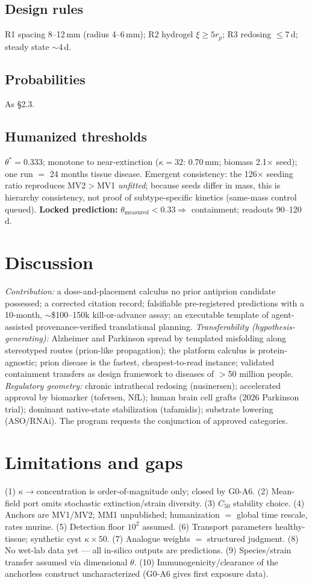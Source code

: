 \documentclass[10pt,twocolumn]{article}
\begin{document}
\subsection{Design rules} R1 spacing 8--12\,mm (radius 4--6\,mm); R2 hydrogel $\xi\ge5r_p$; R3 redosing $\le$7\,d; steady state $\sim$4\,d.
\subsection{Probabilities} As \S2.3.
\subsection{Humanized thresholds} $\theta^{*}{=}0.333$; monotone to near-extinction ($\kappa{=}32$: 0.70\,mm; biomass 2.1$\times$ seed); one run $=$ 24 months tissue disease. Emergent consistency: the 126$\times$ seeding ratio reproduces MV2$>$MV1 \emph{unfitted}; because seeds differ in mass, this is hierarchy consistency, not proof of subtype-specific kinetics (same-mass control queued). \textbf{Locked prediction:} $\theta_{\text{measured}}<0.33\Rightarrow$ containment; readouts 90--120\,d.

\section{Discussion}
\emph{Contribution:} a dose-and-placement calculus no prior antiprion candidate possessed; a corrected citation record; falsifiable pre-registered predictions with a 10-month, $\sim$\$100--150k kill-or-advance assay; an executable template of agent-assisted provenance-verified translational planning. \emph{Transferability (hypothesis-generating):} Alzheimer and Parkinson spread by templated misfolding along stereotyped routes (prion-like propagation); the platform calculus is protein-agnostic; prion disease is the fastest, cheapest-to-read instance; validated containment transfers as design framework to diseases of $>$50 million people. \emph{Regulatory geometry:} chronic intrathecal redosing (nusinersen); accelerated approval by biomarker (tofersen, NfL); human brain cell grafts (2026 Parkinson trial); dominant native-state stabilization (tafamidis); substrate lowering (ASO/RNAi). The program requests the conjunction of approved categories.

\section{Limitations and gaps}
(1) $\kappa\to$concentration is order-of-magnitude only; closed by G0-A6. (2) Mean-field port omits stochastic extinction/strain diversity. (3) $C_{50}$ stability choice. (4) Anchors are MV1/MV2; MM1 unpublished; humanization $=$ global time rescale, rates murine. (5) Detection floor $10^{2}$ assumed. (6) Transport parameters healthy-tissue; synthetic cyst $\kappa\times50$. (7) Analogue weights $=$ structured judgment. (8) No wet-lab data yet --- all in-silico outputs are predictions. (9) Species/strain transfer assumed via dimensional $\theta$. (10) Immunogenicity/clearance of the anchorless construct uncharacterized (G0-A6 gives first exposure data).
\end{document}
